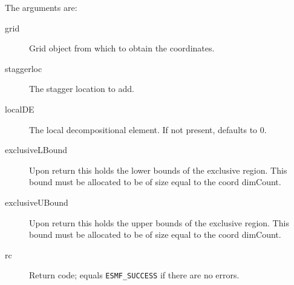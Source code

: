     The arguments are:
    \begin{description}
    \item[grid]
      Grid object from which to obtain the coordinates.
    \item[staggerloc]
      The stagger location to add.
    \item[localDE]
      The local decompositional element. If not present, defaults to 0.
    \item[exclusiveLBound]
      Upon return this holds the lower bounds of the exclusive region. This bound
      must be allocated to be of size equal to the coord dimCount.  
    \item[exclusiveUBound]
      Upon return this holds the upper bounds of the exclusive region. This bound
      must be allocated to be of size equal to the coord dimCount.  
    \item[rc]
    Return code; equals {\tt ESMF\_SUCCESS} if there are no errors. 
    \end{description}
  
\setlength{\parskip}{\oldparskip}
\setlength{\parindent}{\oldparindent}
\setlength{\baselineskip}{\oldbaselineskip}
